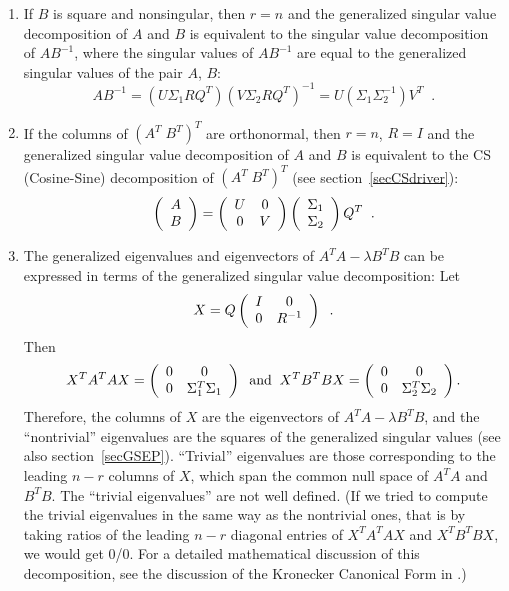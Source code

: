 \begin{enumerate}

\item If $B$ is square and nonsingular, then $r=n$ and the
generalized singular value decomposition of $A$ and $B$ is equivalent
to the singular value decomposition of $AB^{-1}$, where the singular
values of $AB^{-1}$ are equal to the generalized singular values of the
pair $A$, $B$:
\[
AB^{-1} = (U \Sigma_1 R Q^T)(V \Sigma_2 R Q^T)^{-1} =
U ( \Sigma_1 \Sigma_2^{-1} ) V^T \; \; .
\]

\item If the columns of $(A^T \; B^T)^T$ are orthonormal, then $r=n$, $R=I$ and the
generalized
singular value decomposition of $A$ and $B$ is equivalent to the CS
(Cosine-Sine) decomposition of $(A^T \; B^T)^T$ \cite{GVL2} (see section~\ref{secCSdriver}):
\[
\bmat{c} A \\ B \emat = \bmat{cc} U & 0 \\ 0 & V \emat
\bmat{c} \Sigma_1 \\ \Sigma_2 \emat Q^T \; \; .
\]

\item The generalized eigenvalues and eigenvectors of $A^TA - \lambda B^TB$
can be expressed in terms of the generalized singular value decomposition:
Let
\[
X = Q \bmat{cc} I & 0 \\ 0 & R^{-1} \emat \; \; .
\]
Then
\[
X^T A^T A X = \left( \begin{array}{cc}
                       0 & 0   \\
                       0 & \Sigma^T_1 \Sigma_1
                       \end{array} \right) \;\; {\rm and} \;\;
X^T B^T B X = \left( \begin{array}{cc}
                       0 & 0   \\
                       0 & \Sigma^T_2 \Sigma_2
                       \end{array} \right).
\]
Therefore, the columns of $X$ are the eigenvectors of
$A^T A - \lambda  B^T B$, and the ``nontrivial'' eigenvalues are the
squares of the generalized singular values (see also section~\ref{secGSEP}).
``Trivial'' eigenvalues
are those corresponding to the leading $n-r$ columns of $X$,
which span the common null space of $A^T A$ and $B^T B$.
The ``trivial eigenvalues'' are not well defined. (If we tried
to compute the trivial eigenvalues in the same way as the nontrivial
ones, that is by taking ratios of the leading $n-r$ diagonal entries
of $X^T A^T AX$ and $X^T B^T B X$, we would get 0/0. For a detailed
mathematical discussion of this decomposition, see the discussion of
the Kronecker Canonical Form in \cite{gantmacher}.)

\end{enumerate}

